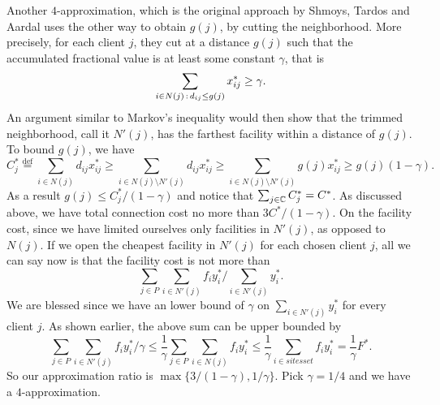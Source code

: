 \documentclass[oneside,final]{ucr}
\begin{document}
Another $4$-approximation, which is the original approach by Shmoys,
Tardos and Aardal uses the other way to obtain $g(j)$, by cutting the
neighborhood. More precisely, for each client $j$, they cut at a
distance $g(j)$ such that the accumulated fractional value is at least
some constant $\gamma$, that is
\begin{equation*}
  \sum_{i\in N(j){\,:\,} d_{ij} \leq g(j)} x_{ij}^\ast \geq \gamma.
\end{equation*}
An argument similar to Markov's inequality would then show that the
trimmed neighborhood, call it $N'(j)$, has the farthest facility
within a distance of $g(j)$. To bound $g(j)$, we have
\begin{equation*}
  C_j^\ast \stackrel{\text{def}}{=} \sum_{i\in N(j)} d_{ij} x_{ij}^\ast \geq \sum_{i\in
    N(j)\setminus N'(j)} d_{ij} x_{ij}^\ast \geq \sum_{i \in N(j)
    \setminus N'(j)} g(j) x_{ij}^\ast \geq g(j) (1 - \gamma).
\end{equation*}
As a result $g(j) \leq C_j^\ast / (1 - \gamma)$ and notice that
$\sum_{j\in \mathbb{C}} C_j^\ast = C^\ast$. As discussed above, we
have total connection cost no more than $3C^\ast/(1-\gamma)$. On the
facility cost, since we have limited ourselves only facilities in
$N'(j)$, as opposed to $N(j)$. If we open the cheapest facility in
$N'(j)$ for each chosen client $j$, all we can say now is that the
facility cost is not more than
\begin{equation*}
  \sum_{j \in P} \sum_{i\in N'(j)} f_i y_i^\ast / \sum_{i\in N'(j)} y_i^\ast.
\end{equation*}
We are blessed since we have an lower bound of $\gamma$ on
$\sum_{i\in N'(j)} y_i^\ast$ for every client $j$. As shown
earlier, the above sum can be upper bounded by
\begin{equation*}
  \sum_{j \in P} \sum_{i\in N'(j)} f_i y_i^\ast / \gamma \leq
  \frac{1}{\gamma} \sum_{j \in P} \sum_{i \in N(j)} f_i y_i^\ast \leq
  \frac{1}{\gamma} \sum_{i \in sitesset} f_i y_i^\ast =
  \frac{1}{\gamma} F^\ast.
\end{equation*}
So our approximation ratio is $\max\{3/(1-\gamma), 1/\gamma\}$. Pick
$\gamma=1/4$ and we have a $4$-approximation.
\end{document}
